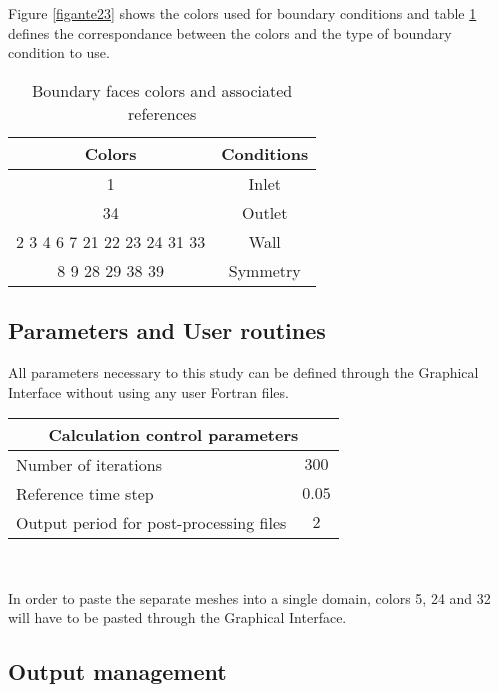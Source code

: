 Figure \ref{figante23} shows the colors used for boundary conditions and 
table \ref{tabante21} defines the correspondance between the colors and  
the type of boundary condition to use.

\begin{table}[htp]
\begin{center}
\begin{tabular}{|c|c|} 
\hline
Colors & Conditions \\
\hline
1 & Inlet \\
\hline
34 & Outlet \\
\hline
2 3 4 6 7 21 22 23 24 31 33 & Wall \\
\hline
8 9 28 29 38 39 & Symmetry \\
\hline
\end{tabular}
\caption{Boundary faces colors and associated references}
\label{tabante21}
\end{center}
\end{table}


	\subsection{Parameters and User routines}

All parameters necessary to this study can be defined through the Graphical
Interface without using any user Fortran files.

\begin{center}
\begin{tabular}{|l|c|}
\hline
\multicolumn{2}{|c|}{Calculation control parameters} \\
\hline
Number of iterations & $300$ \\
\hline
Reference time step & $0.05$ \\
\hline
Output period for post-processing files& $2$ \\
\hline
\end{tabular}\\
\end{center}

In order to paste the separate meshes into a single domain, colors 5, 24 and 32
will have to be pasted through the Graphical Interface.



	\subsection{Output management}

